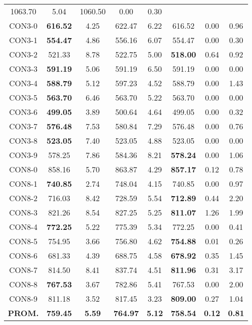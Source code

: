 \begin{table}[h]
\begin{tabular}{c c c c c c c c}
1063.70 & 5.04 & 1060.50 & 0.00
 & 0.30\\CON3-0 & \bf{616.52} & 4.25 & 
622.47 & 6.22 & 616.52 & 0.00
 & 0.96\\CON3-1 & \bf{554.47} & 4.86 & 
556.16 & 6.07 & 554.47 & 0.00
 & 0.30\\CON3-2 & 521.33 & 8.78 & 
522.75 & 5.00 & \bf{518.00} & 
0.64 & 0.92\\CON3-3 & \bf{591.19} & 5.06 & 
591.19 & 6.50 & 591.19 & 0.00
 & 0.00\\
CON3-4 & \bf{588.79} & 5.12 & 
597.23 & 4.52 & 588.79 & 0.00
 & 1.43\\CON3-5 & \bf{563.70} & 6.46 & 
563.70 & 5.22 & 563.70 & 0.00
 & 0.00\\
CON3-6 & \bf{499.05} & 3.89 & 
500.64 & 4.64 & 499.05 & 0.00
 & 0.32\\CON3-7 & \bf{576.48} & 7.53 & 
580.84 & 7.29 & 576.48 & 0.00
 & 0.76\\CON3-8 & \bf{523.05} & 7.40 & 
523.05 & 4.88 & 523.05 & 0.00
 & 0.00\\
CON3-9 & 578.25 & 7.86 & 
584.36 & 8.21 & \bf{578.24} & 
0.00 & 1.06\\CON8-0 & 858.16 & 5.70 & 
863.87 & 4.29 & \bf{857.17} & 
0.12 & 0.78\\CON8-1 & \bf{740.85} & 2.74 & 
748.04 & 4.15 & 740.85 & 0.00
 & 0.97\\CON8-2 & 716.03 & 8.42 & 
728.59 & 5.54 & \bf{712.89} & 
0.44 & 2.20\\CON8-3 & 821.26 & 8.54 & 
827.25 & 5.25 & \bf{811.07} & 
1.26 & 1.99\\CON8-4 & \bf{772.25} & 5.22 & 
775.39 & 5.34 & 772.25 & 0.00
 & 0.41\\CON8-5 & 754.95 & 3.66 & 
756.80 & 4.62 & \bf{754.88} & 
0.01 & 0.26\\CON8-6 & 681.33 & 4.39 & 
688.75 & 4.58 & \bf{678.92} & 
0.35 & 1.45\\CON8-7 & 814.50 & 8.41 & 
837.74 & 4.51 & \bf{811.96} & 
0.31 & 3.17\\CON8-8 & \bf{767.53} & 3.67 & 
782.86 & 5.41 & 767.53 & 0.00
 & 2.00\\CON8-9 & 811.18 & 3.52 & 
817.45 & 3.23 & \bf{809.00} & 
0.27 & 1.04\\\bf{PROM.} & 
\bf{759.45} & \bf{5.59} & \bf{764.97} & \bf{5.12} & \bf{758.54} & \bf{0.12} & \bf{0.81}\\[1ex]\hline
\end{tabular}
\label{table:nonlin}
\end{table}
